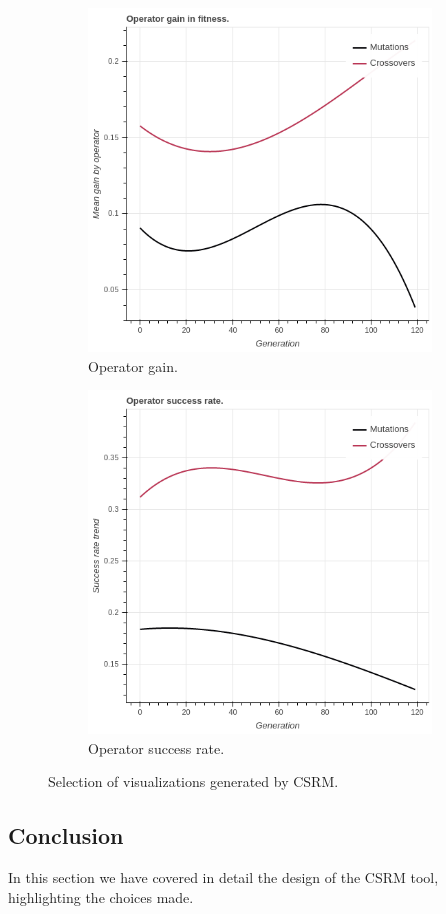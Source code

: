 \begin{figure}
\begin{subfigure}{0.5\textwidth}
    \centering
        \includegraphics[width=0.8\linewidth]{figures/viz_operatorgaintrend.png}
        \caption{Operator gain.}
    \end{subfigure}%
    \begin{subfigure}{0.5\textwidth}
    \centering
        \includegraphics[width=0.8\linewidth]{figures/viz_operatorsuccessratetrend.png}
        \caption{Operator success rate.}
    \end{subfigure}
    \caption{Selection of visualizations generated by CSRM.}
    \label{fig:viz}
\end{figure}

\subsection{Conclusion}
In this section we have covered in detail the design of the CSRM tool, highlighting the choices made. 
% 
